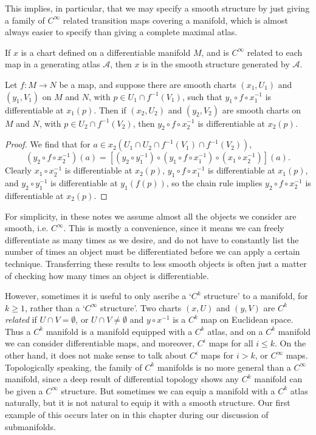 This implies, in particular, that we may specify a smooth structure by just giving a family of $C^\infty$ related transition maps covering a manifold, which is almost always easier to specify than giving a complete maximal atlas.

\begin{corollary}
    If $x$ is a chart defined on a differentiable manifold $M$, and is $C^\infty$ related to each map in a generating atlas $\mathcal{A}$, then $x$ is in the smooth structure generated by $\mathcal{A}$.
\end{corollary}

\begin{lemma}
    Let $f: M \to N$ be a map, and suppose there are smooth charts $(x_1,U_1)$ and $(y_1,V_1)$ on $M$ and $N$, with $p \in U_1 \cap f^{-1}(V_1)$, such that $y_1 \circ f \circ x_1^{-1}$ is differentiable at $x_1(p)$. Then if $(x_2,U_2)$ and $(y_2,V_2)$ are smooth charts on $M$ and $N$, with $p \in U_2 \cap f^{-1}(V_2)$, then $y_2 \circ f \circ x_2^{-1}$ is differentiable at $x_2(p)$.
\end{lemma}
\begin{proof}
    We find that for $a \in x_2(U_1 \cap U_2 \cap f^{-1}(V_1) \cap f^{-1}(V_2))$,
    \[ (y_2 \circ f \circ x_2^{-1})(a) = [(y_2 \circ y_1^{-1}) \circ (y_1 \circ f \circ x_1^{-1}) \circ (x_1 \circ x_2^{-1})](a). \]
    Clearly $x_1 \circ x_2^{-1}$ is differentiable at $x_2(p)$, $y_1 \circ f \circ x_1^{-1}$ is differentiable at $x_1(p)$, and $y_2 \circ y_1^{-1}$ is differentiable at $y_1(f(p))$, so the chain rule implies $y_2 \circ f \circ x_2^{-1}$ is differentiable at $x_2(p)$.
\end{proof}

For simplicity, in these notes we assume almost all the objects we consider are smooth, i.e. $C^\infty$. This is mostly a convenience, since it means we can freely differentiate as many times as we desire, and do not have to constantly list the number of times an object must be differentiated before we can apply a certain technique. Transferring these results to less smooth objects is often just a matter of checking how many times an object is differentiable.

However, sometimes it is useful to only ascribe a `$C^k$ structure' to a manifold, for $k \geq 1$, rather than a `$C^\infty$ structure'. Two charts $(x,U)$ and $(y,V)$ are \emph{$C^k$ related} if $U \cap V = \emptyset$, or $U \cap V \neq \emptyset$ and $y \circ x^{-1}$ is a $C^k$ map on Euclidean space. Thus a $C^k$ manifold is a manifold equipped with a $C^k$ atlas, and on a $C^k$ manifold we can consider differentiable maps, and moreover, $C^i$ maps for all $i \leq k$. On the other hand, it does not make sense to talk about $C^i$ maps for $i > k$, or $C^\infty$ maps. Topologically speaking, the family of $C^k$ manifolds is no more general than a $C^\infty$ manifold, since a deep result of differential topology shows any $C^k$ manifold can be given a $C^\infty$ structure. But sometimes we can equip a manifold with a $C^k$ atlas naturally, but it is not natural to equip it with a smooth structure. Our first example of this occurs later on in this chapter during our discussion of submanifolds.

